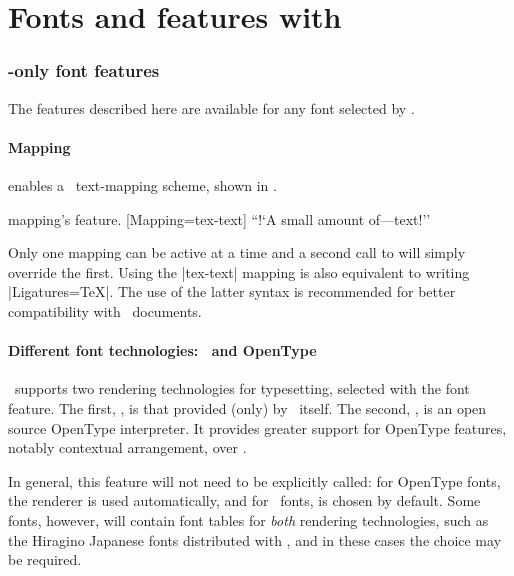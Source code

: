 

\part{Fonts and features with \XeTeX}
\label{sec:xetex-features}

\section{\XeTeX-only font features}

The features described here are available for any font
selected by .

\subsection{Mapping}
\label{sec:mapping}

 enables a \XeTeX\ text-mapping scheme, shown in .

\begin{Xexample}{mapping}{\XeTeX's  feature.}
  [Mapping=tex-text]
  ``!`A small amount of---text!''
\end{Xexample}

Only one mapping can be active at a time and a second call to 
will simply override the first.
Using the |tex-text| mapping is also equivalent to writing |Ligatures=TeX|.
The use of the latter syntax is recommended for better compatibility with
\LuaTeX\ documents.


\subsection{Different font technologies: \AAT\ and OpenType}\label{sec:renderer}

\XeTeX\ supports two rendering technologies for typesetting, selected with
the  font feature. The first, , is
that provided (only) by \MacOSX\ itself. The second, ,
is an open source OpenType interpreter.
It provides greater support for
OpenType features, notably contextual arrangement, over .

In general, this feature will not need to be explicitly called: for OpenType
fonts, the  renderer is used automatically, and for \AAT\ fonts,
 is chosen by default. Some fonts, however, will contain font tables
for \emph{both} rendering technologies, such as the Hiragino Japanese fonts
distributed with \MacOSX, and in these cases the choice may be required.

